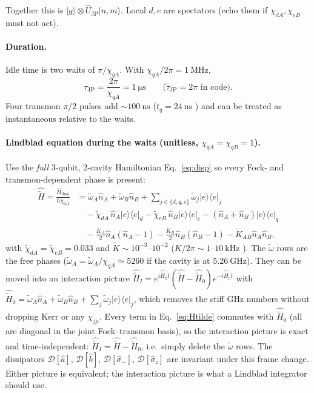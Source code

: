 \documentclass[11pt]{article}
\newcommand{\Pe}[1]{\lvert e\rangle\!\langle e\rvert_{#1}}
\newcommand{\Ujp}{\hat{U}_{\mathrm{JP}}}
\begin{document}
Together this is $\lvert g\rangle\otimes\Ujp\lvert n,m\rangle$.  Local $d,e$
are spectators (echo them if $\chi_{dA},\chi_{eB}$ must not act).

\paragraph{Duration.}
Idle time is two waits of $\pi/\chi_{qA}$.  With
$\chi_{qA}/2\pi=1~\mathrm{MHz}$,
\begin{equation}
\tau_{\mathrm{JP}}=\frac{2\pi}{\chi_{qA}}=1~\mathrm{\mu s}
\qquad\bigl(\tilde\tau_{\mathrm{JP}}=2\pi\text{ in code}\bigr).
\end{equation}
Four transmon $\pi/2$ pulses add $\sim 100~\mathrm{ns}$
($t_q=24~\mathrm{ns}$ \cite{Eickbusch2022}) and can be treated as
instantaneous relative to the waits.

\paragraph{Lindblad equation during the waits
(unitless, $\chi_{qA}=\chi_{qB}=1$).}
Use the \emph{full} 3-qubit, 2-cavity Hamiltonian Eq.~\eqref{eq:disp} so
every Fock- and transmon-dependent phase is present:
\begin{align}
\hat{\widetilde{H}}
=\frac{\hat{H}_{\mathrm{disp}}}{\hbar\chi_{qA}}
&=\tilde\omega_A\hat{n}_A+\tilde\omega_B\hat{n}_B
 +\sum_{j\in\{d,q,e\}}\tilde\omega_j\Pe{j}
\nonumber\\
&\quad
 -\tilde\chi_{dA}\,\hat{n}_A\Pe{d}
 -\tilde\chi_{eB}\,\hat{n}_B\Pe{e}
 -(\hat{n}_A+\hat{n}_B)\Pe{q}
\nonumber\\
&\quad
 -\tfrac{\tilde K_A}{2}\hat{n}_A(\hat{n}_A-1)
 -\tfrac{\tilde K_B}{2}\hat{n}_B(\hat{n}_B-1)
 -\tilde K_{AB}\hat{n}_A\hat{n}_B ,
\label{eq:Htilde}
\end{align}
with $\tilde\chi_{dA}=\tilde\chi_{eB}=0.033$ and
$\tilde K\sim10^{-3}$--$10^{-2}$ ($K/2\pi\sim1$--$10~\mathrm{kHz}$
\cite{Wang2016}).  The $\tilde\omega$ rows are the free phases
($\tilde\omega_A=\widetilde\omega_A/\chi_{qA}\simeq5260$ if the cavity is at
$5.26~\mathrm{GHz}$).  They can be moved into an interaction picture
$\hat{\widetilde{H}}_I=e^{i\hat{\widetilde{H}}_0\tilde t}
(\hat{\widetilde{H}}-\hat{\widetilde{H}}_0)
e^{-i\hat{\widetilde{H}}_0\tilde t}$ with
$\hat{\widetilde{H}}_0=\tilde\omega_A\hat{n}_A+\tilde\omega_B\hat{n}_B
+\sum_j\tilde\omega_j\Pe{j}$, which removes the stiff GHz numbers without
dropping Kerr or any $\chi_{j\mu}$.  Every term in
Eq.~\eqref{eq:Htilde} commutes with $\hat{\widetilde{H}}_0$ (all are
diagonal in the joint Fock--transmon basis), so the interaction picture is
exact and time-independent:
$\hat{\widetilde{H}}_I=\hat{\widetilde{H}}-\hat{\widetilde{H}}_0$, i.e.\
simply delete the $\tilde\omega$ rows.  The dissipators
$\mathcal{D}[\hat{a}]$, $\mathcal{D}[\hat{b}]$,
$\mathcal{D}[\hat\sigma_-]$, $\mathcal{D}[\hat\sigma_z]$ are invariant
under this frame change.  Either picture is equivalent; the
interaction picture is what a Lindblad integrator should use.
\end{document}
